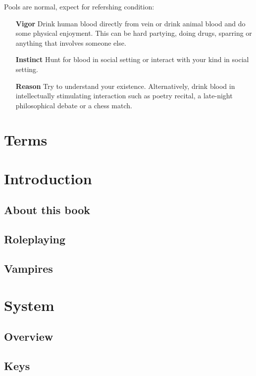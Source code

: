 \documentclass[a4paper, 12pt, finnish]{article}
\begin{document}
{\cols{
\VampiricKey{}
}

\pagebreak
Pools are normal, expect for refershing condition:

\begin{itemize}
\item[\textbf{Vigor}] Drink human blood directly from vein or drink animal blood and do some physical enjoyment. This can be hard partying, doing drugs, sparring or anything that involves someone else.
\item[\textbf{Instinct}] Hunt for blood in social setting or interact with your kind in social setting.
\item[\textbf{Reason}] Try to understand your existence. Alternatively, drink blood in intellectually stimulating interaction such as poetry recital, a late-night philosophical debate or a chess match.
\end{itemize}
}

\tableofcontents
\pagebreak

\section{Terms}\label{sec:terms}
\section{Introduction}\label{sec:introduction}
	\subsection{About this book}\label{ssec:about}
		
	\subsection{Roleplaying}\label{ssec:roleplaying}
		
	\subsection{Vampires}\label{ssec:vampires}
		
\section{System}\label{sec:System}
	\subsection{Overview}\label{ssec:overview}
		
	\subsection{Keys}\label{ssec:keys}
		
\end{document}

